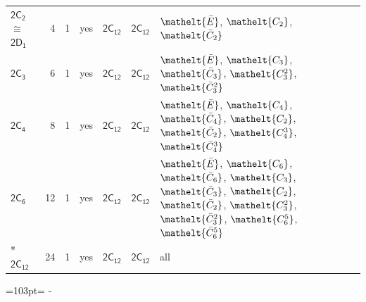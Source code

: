 \documentclass[10pt,a4paper]{article}
\newcommand{\needspace}[1]{\par\penalty-100\begingroup\dimen0=#1\relax\dimen2=\pagegoal
  \advance\dimen2-\pagetotal\ifdim\dimen0>\dimen2\relax\ifdim\dimen2>0pt\vfil\break\fi\fi
  \endgroup}
\numberwithin{equation}{section}
\newcommand{\eltfont}[1]{{\let\sigma\eltsigma\mathelt{#1}}}
\newcommand{\grp}[1]{\mathsf{#1}}
\newcommand{\cls}[1]{\eltfont{#1}}
\newcommand{\samecls}{\cong}
\newcommand{\barred}[1]{\bar{#1}}
\newlength{\fillwidth}\newlength{\cellwidth}\newlength{\colwidth}
\begin{document}
{\begin{longtable}{@{}lrrlll>{\RaggedRight\arraybackslash}p{\fillwidth}@{}}
\href{2C2.pdf}{$\grp{2C_{2}}$} $\samecls$ \href{2D1.pdf}{$\grp{2D_{1}}$} & 4 & 1 & yes & \href{2C12.pdf}{$\grp{2C_{12}}$} & \href{2C12.pdf}{$\grp{2C_{12}}$} & $\cls{\barred{E}}$, $\cls{C_{2}}$, $\cls{\barred{C}_{2}}$\\
\href{2C3.pdf}{$\grp{2C_{3}}$} & 6 & 1 & yes & \href{2C12.pdf}{$\grp{2C_{12}}$} & \href{2C12.pdf}{$\grp{2C_{12}}$} & $\cls{\barred{E}}$, $\cls{C_{3}}$, $\cls{\barred{C}_{3}}$, $\cls{C_{3}^{2}}$, $\cls{\barred{C}_{3}^{2}}$\\
\href{2C4.pdf}{$\grp{2C_{4}}$} & 8 & 1 & yes & \href{2C12.pdf}{$\grp{2C_{12}}$} & \href{2C12.pdf}{$\grp{2C_{12}}$} & $\cls{\barred{E}}$, $\cls{C_{4}}$, $\cls{\barred{C}_{4}}$, $\cls{C_{2}}$, $\cls{\barred{C}_{2}}$, $\cls{C_{4}^{3}}$, $\cls{\barred{C}_{4}^{3}}$\\
\href{2C6.pdf}{$\grp{2C_{6}}$} & 12 & 1 & yes & \href{2C12.pdf}{$\grp{2C_{12}}$} & \href{2C12.pdf}{$\grp{2C_{12}}$} & $\cls{\barred{E}}$, $\cls{C_{6}}$, $\cls{\barred{C}_{6}}$, $\cls{C_{3}}$, $\cls{\barred{C}_{3}}$, $\cls{C_{2}}$, $\cls{\barred{C}_{2}}$, $\cls{C_{3}^{2}}$, $\cls{\barred{C}_{3}^{2}}$, $\cls{C_{6}^{5}}$, $\cls{\barred{C}_{6}^{5}}$\\*
\href{2C12.pdf}{$\grp{2C_{12}}$} & 24 & 1 & yes & \href{2C12.pdf}{$\grp{2C_{12}}$} & \href{2C12.pdf}{$\grp{2C_{12}}$} & all\\
\bottomrule\end{longtable}}
\needspace{103pt}
\end{document}
